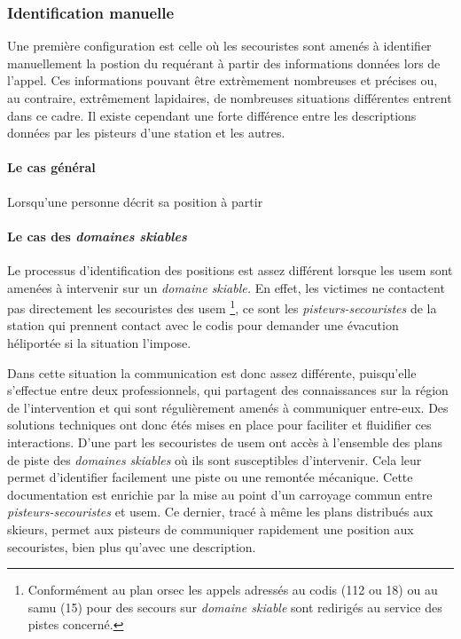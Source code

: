 \subsubsection{Identification manuelle}
\label{subsec:1-1-2-1}

Une première configuration est celle où les secouristes sont amenés à
identifier manuellement la postion du requérant à partir des
informations données lors de l'appel. Ces informations pouvant être
extrèmement nombreuses et précises ou, au contraire, extrêmement
lapidaires, de nombreuses situations différentes entrent dans ce
cadre. Il existe cependant une forte différence entre les descriptions
données par les pisteurs d'une station et les autres.

\paragraph{Le cas général}

Lorsqu'une personne décrit sa position à partir




\paragraph{Le cas des \emph{domaines skiables}}

Le processus d'identification des positions est assez différent
lorsque les \ac{usem} sont amenées à intervenir sur un \emph{domaine
  skiable.} En effet, les victimes ne contactent pas directement les
secouristes des \ac{usem} \footnote{Conformément au plan \ac{orsec}
  les appels adressés au \ac{codis} (112 ou 18) ou au \ac{samu} (15)
  pour des secours sur \emph{domaine skiable} sont redirigés au
  service des pistes concerné.}, ce sont les
\emph{pisteurs-secouristes} de la station qui prennent contact avec le
\ac{codis} pour demander une évacution héliportée si la situation
l'impose.

Dans cette situation la communication est donc assez différente,
puisqu'elle s'effectue entre deux professionnels, qui partagent des
connaissances sur la région de l'intervention et qui sont
régulièrement amenés à communiquer entre-eux. Des solutions techniques
ont donc étés mises en place pour faciliter et fluidifier ces
interactions. D'une part les secouristes de \ac{usem} ont accès à
l'ensemble des plans de piste des \emph{domaines skiables} où ils sont
susceptibles d'intervenir. Cela leur permet d'identifier facilement
une piste ou une remontée mécanique. Cette documentation est enrichie
par la mise au point d'un carroyage commun entre
\emph{pisteurs-secouristes} et \ac{usem}. Ce dernier, tracé à même les
plans distribués aux skieurs, permet aux pisteurs de communiquer
rapidement une position aux secouristes, bien plus qu'avec une
description.

